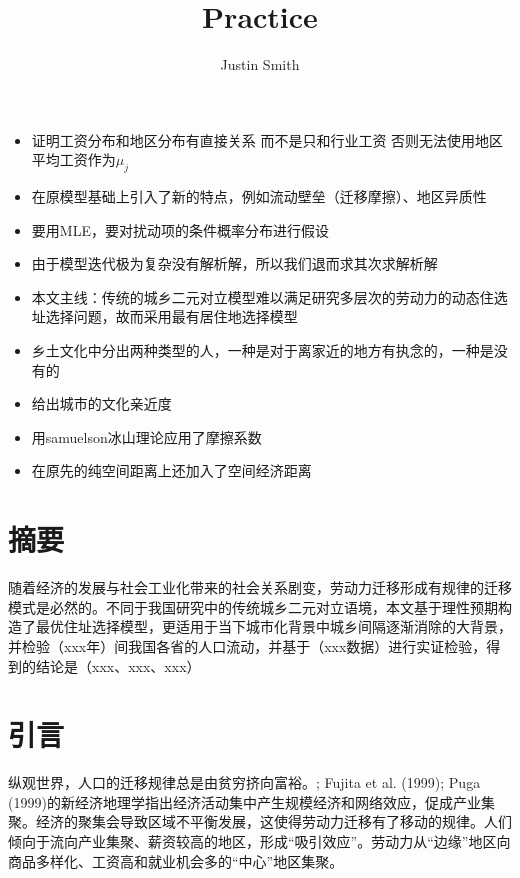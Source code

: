 \documentclass[10pt,a4paper]{article}
\title{Practice}
\author{Justin Smith}
\begin{document}
\maketitle

\begin{itemize}
  \item 证明工资分布和地区分布有直接关系 而不是只和行业工资 否则无法使用地区平均工资作为$\mu_{j}$
  \item 在原模型基础上引入了新的特点，例如流动壁垒（迁移摩擦）、地区异质性
  \item 要用MLE，要对扰动项的条件概率分布进行假设
  \item 由于模型迭代极为复杂没有解析解，所以我们退而求其次求解析解
  \item 本文主线：传统的城乡二元对立模型难以满足研究多层次的劳动力的动态住选址选择问题，故而采用最有居住地选择模型
  \item 乡土文化中分出两种类型的人，一种是对于离家近的地方有执念的，一种是没有的
  \item 给出城市的文化亲近度
  \item 用samuelson冰山理论应用了摩擦系数
  \item 在原先的纯空间距离上还加入了空间经济距离
\end{itemize}

\section{摘要}
随着经济的发展与社会工业化带来的社会关系剧变，劳动力迁移形成有规律的迁移模式是必然的。不同于我国研究中的传统城乡二元对立语境，本文基于理性预期构造了最优住址选择模型，更适用于当下城市化背景中城乡间隔逐渐消除的大背景，并检验（xxx年）间我国各省的人口流动，并基于（xxx数据）进行实证检验，得到的结论是（xxx、xxx、xxx）



\section{引言}



纵观世界，人口的迁移规律总是由贫穷挤向富裕。\cite{krugmanIncreasingReturnsEconomic1991}; Fujita et al. (1999)\cite{fujitaSpatialEconomyCities}; Puga (1999)的新经济地理学指出经济活动集中产生规模经济和网络效应，促成产业集聚。经济的聚集会导致区域不平衡发展，这使得劳动力迁移有了移动的规律。人们倾向于流向产业集聚、薪资较高的地区，形成“吸引效应”。劳动力从“边缘”地区向商品多样化、工资高和就业机会多的“中心”地区集聚。
\end{document}
